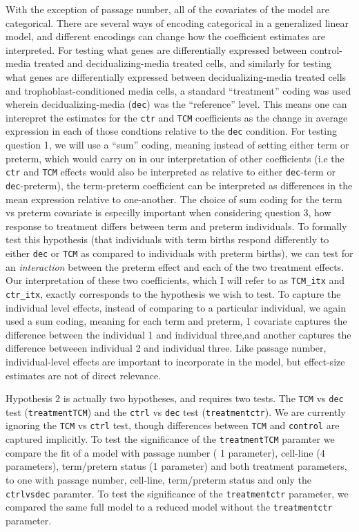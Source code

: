 With the exception of passage number, all of the covariates of the model are categorical. There are several ways of encoding categorical in a generalized linear model, and different encodings  can change how the coefficient estimates are interpreted. For testing what genes are differentially expressed between control-media treated and decidualizing-media treated cells, and similarly for testing what genes are differentially expressed between decidualizing-media treated cells and trophoblast-conditioned media cells, a standard ``treatment'' coding was used wherein decidualizing-media (\texttt{dec}) was the ``reference'' level.
This means one can interepret the estimates for the \texttt{ctr} and \texttt{TCM} coefficients as the change in average expression in each of those condtions relative to the \texttt{dec} condition.
For testing question 1, we will use a ``sum'' coding, meaning instead of setting either term or preterm, which would carry on in our interpretation of other coefficients (i.e the \texttt{ctr} and \texttt{TCM} effects would also be 
interpreted as relative to either \texttt{dec}-term or \texttt{dec}-preterm), the term-preterm coefficient can be interpreted as differences in the mean expression relative to one-another.  The choice of sum coding for the term
vs preterm covariate is especilly important when considering question 3, how response to treatment differs between term and preterm individuals.  To formally test this hypothesis (that individuals with term births respond differently
to either \texttt{dec} or \texttt{TCM} as compared to individuals with preterm births), we can test for an \emph{interaction} between the preterm effect and each of the two treatment effects.  Our interpretation of these two
coefficients, which I will refer to as \texttt{TCM\_itx} and \texttt{ctr\_itx}, exactly corresponds to the hypothesis we wish to test.  To capture the individual level effects, instead of comparing to a particular individual,
we again used a sum coding, meaning for each term and preterm,  1 covariate captures the difference between the individual 1 and individual three,and another captures the difference betweeen individual 2 and individual three.
Like passage number, individual-level effects are important to incorporate in the model, but effect-size estimates are not of direct relevance.

Hypothesis 2 is actually two hypotheses, and requires two tests. The \texttt{TCM} vs \texttt{dec} test (\texttt{treatmentTCM}) and the \texttt{ctrl} vs \texttt{dec} test (\texttt{treatmentctr}).
We are currently ignoring the \texttt{TCM} vs \texttt{ctrl} test, though differences between \texttt{TCM} and \texttt{control} are captured implicitly.  To test the significance of the \texttt{treatmentTCM} paramter we compare the fit of a model with passage number ( 1 parameter), cell-line (4 parameters), term/pretern status (1 parameter) and both treatment parameters, to one with passage number, cell-line, term/preterm status and only the \texttt{ctrlvsdec} paramter.
To test the significance of the \texttt{treatmentctr} parameter, we compared the same full model to a reduced model without the \texttt{treatmentctr} parameter.


